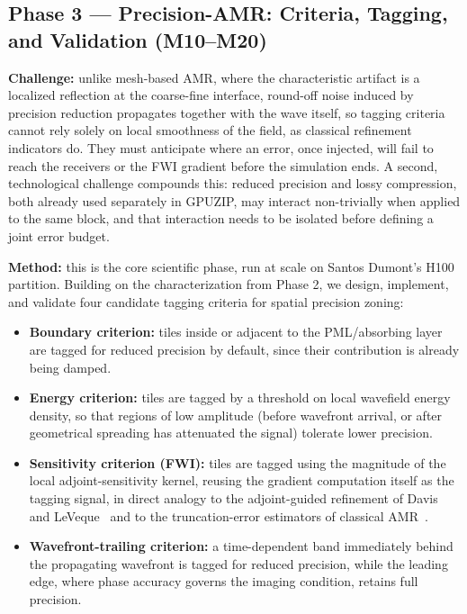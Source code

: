 \documentclass[12pt,a4paper]{article}
\begin{document}
\subsection{Phase 3 --- Precision-AMR: Criteria, Tagging, and Validation
(M10--M20)}

\textbf{Challenge:} unlike mesh-based AMR, where the characteristic
artifact is a localized reflection at the coarse-fine interface, round-off
noise induced by precision reduction propagates together with the wave
itself, so tagging criteria cannot rely solely on local smoothness of the
field, as classical refinement indicators do. They must anticipate where
an error, once injected, will fail to reach the receivers or the FWI
gradient before the simulation ends. A second, technological challenge
compounds this: reduced precision and lossy compression, both already used
separately in GPUZIP, may interact non-trivially when applied to the same
block, and that interaction needs to be isolated before defining a joint
error budget.

\textbf{Method:} this is the core scientific phase, run at scale on Santos
Dumont's H100 partition. Building on the characterization from Phase 2, we
design, implement, and validate four candidate tagging criteria for
spatial precision zoning:

\begin{itemize}
  \item \textbf{Boundary criterion:} tiles inside or adjacent to the
        PML/absorbing layer are tagged for reduced precision by default,
        since their contribution is already being damped.
  \item \textbf{Energy criterion:} tiles are tagged by a threshold on
        local wavefield energy density, so that regions of low amplitude
        (before wavefront arrival, or after geometrical spreading has
        attenuated the signal) tolerate lower precision.
  \item \textbf{Sensitivity criterion (FWI):} tiles are tagged using the
        magnitude of the local adjoint-sensitivity kernel, reusing the
        gradient computation itself as the tagging signal, in direct
        analogy to the adjoint-guided refinement of Davis and
        LeVeque~\cite{davis2015adjoint} and to the truncation-error
        estimators of classical AMR~\cite{berger1989amr}.
  \item \textbf{Wavefront-trailing criterion:} a time-dependent band
        immediately behind the propagating wavefront is tagged for
        reduced precision, while the leading edge, where phase accuracy
        governs the imaging condition, retains full precision.
\end{itemize}
\end{document}
